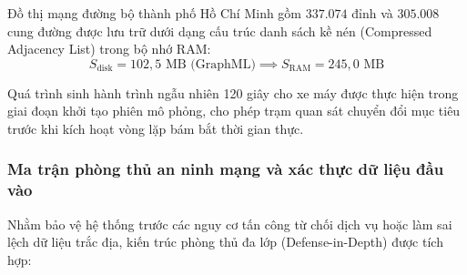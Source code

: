 \hspace{0.5cm} Đồ thị mạng đường bộ thành phố Hồ Chí Minh gồm $337.074$ đỉnh và $305.008$ cung đường được lưu trữ dưới dạng cấu trúc danh sách kề nén (Compressed Adjacency List) trong bộ nhớ RAM:
\begin{equation}
S_{\text{disk}} = 102{,}5\text{ MB (GraphML)} \implies S_{\text{RAM}} = 245{,}0\text{ MB}
\label{eq:graph-memory-expansion}
\end{equation}

\begin{table}[H]
\centering
\caption{Độ phức tạp lý thuyết của các thao tác giải thuật trên đồ thị mạng đường 337.074 nút}
\label{tab:graph-operations-timing}
\end{table}

Quá trình sinh hành trình ngẫu nhiên 120 giây cho xe máy được thực hiện trong giai đoạn khởi tạo phiên mô phỏng, cho phép trạm quan sát chuyển đổi mục tiêu trước khi kích hoạt vòng lặp bám bắt thời gian thực.

\subsubsection{Ma trận phòng thủ an ninh mạng và xác thực dữ liệu đầu vào}

\hspace{0.5cm} Nhằm bảo vệ hệ thống trước các nguy cơ tấn công từ chối dịch vụ hoặc làm sai lệch dữ liệu trắc địa, kiến trúc phòng thủ đa lớp (Defense-in-Depth) được tích hợp:

